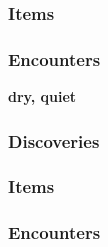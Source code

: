 \subsubsection{Items}
\begin{itemize}
\end{itemize}
\subsubsection{Encounters}
\begin{itemize}
\end{itemize}


\textbf{dry, quiet}
\begin{DndReadAloud}
\end{DndReadAloud}
\subsubsection{Discoveries}
\begin{itemize}
\end{itemize}
\subsubsection{Items}
\begin{itemize}
\end{itemize}
\subsubsection{Encounters}
\begin{itemize}
\end{itemize}


\vfill

